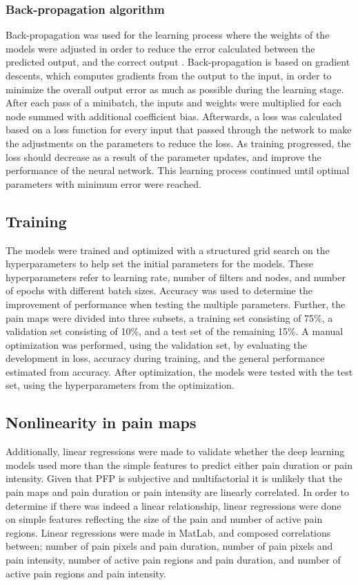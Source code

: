 \subsubsection{Back-propagation algorithm}
Back-propagation was used for the learning process where the weights of the models were adjusted in order to reduce the error calculated between the predicted output, and the correct output \citep{Duda2000}. Back-propagation is based on gradient descents, which computes gradients from the output to the input, in order to minimize the overall output error as much as possible during the learning stage. 
After each pass of a minibatch, the inputs and weights were multiplied for each node summed with additional coefficient bias.\citep{LeCun1998, Hameed2016}
Afterwards, a loss was calculated based on a loss function for every input that passed through the network to make the adjustments on the parameters to reduce the loss. As training progressed, the loss should decrease as a result of the parameter updates, and improve the performance of the neural network.\citep{Goodfellow2016, LeCun2015, Duda2000} This learning process continued until optimal parameters with minimum error were reached.\citep{Hameed2016}

\subsection{Training}
The models were trained and optimized with a structured grid search on the hyperparameters to help set the initial parameters for the models. These hyperparameters refer to learning rate, number of filters and nodes, and number of epochs with different batch sizes. Accuracy was used to determine the improvement of performance when testing the multiple parameters.
Further, the pain maps were divided into three subsets, a training set consisting of 75\%, a validation set consisting of 10\%, and a test set of the remaining 15\%. A manual optimization was performed, using the validation set, by evaluating the development in loss, accuracy during training, and the general performance estimated from accuracy. After optimization, the models were tested with the test set, using the hyperparameters from the optimization.
 
 
\subsection{Nonlinearity in pain maps} 
Additionally, linear regressions were made to validate whether the deep learning models used more than the simple features to predict either pain duration or pain intensity.
Given that PFP is subjective and multifactorial it is unlikely that the pain maps and pain duration or pain intensity are linearly correlated. In order to determine if there was indeed a linear relationship, linear regressions were done on simple features reflecting the size of the pain and number of active pain regions. Linear regressions were made in MatLab, and composed correlations between; number of pain pixels and pain duration, number of pain pixels and pain intensity, number of active pain regions and pain duration, and number of active pain regions and pain intensity.

